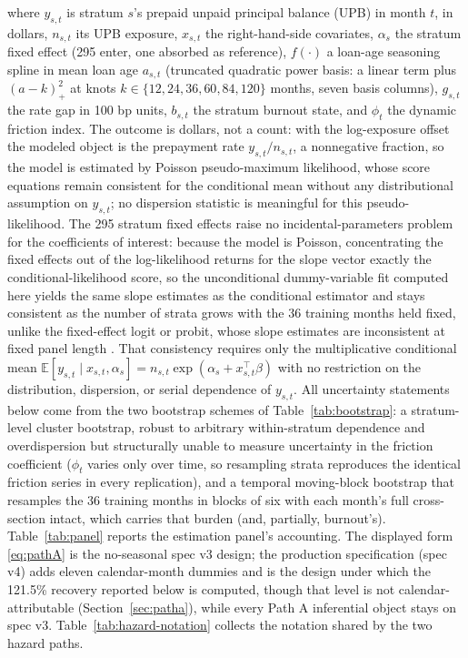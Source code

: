\documentclass[12pt]{article}
\begin{document}
where $y_{s,t}$ is stratum $s$'s prepaid unpaid principal balance (UPB) in month $t$, in dollars, $n_{s,t}$ its UPB exposure, $x_{s,t}$ the right-hand-side covariates, $\alpha_{s}$ the stratum fixed effect (295 enter, one absorbed as reference), $f(\cdot)$ a loan-age seasoning spline in mean loan age $a_{s,t}$ (truncated quadratic power basis: a linear term plus $(a - k)_+^2$ at knots $k \in \{12, 24, 36, 60, 84, 120\}$ months, seven basis columns), $g_{s,t}$ the rate gap in 100 bp units, $b_{s,t}$ the stratum burnout state, and $\phi_t$ the dynamic friction index. The outcome is dollars, not a count: with the log-exposure offset the modeled object is the prepayment rate $y_{s,t}/n_{s,t}$, a nonnegative fraction, so the model is estimated by Poisson pseudo-maximum likelihood, whose score equations remain consistent for the conditional mean without any distributional assumption on $y_{s,t}$; no dispersion statistic is meaningful for this pseudo-likelihood. The 295 stratum fixed effects raise no incidental-parameters problem for the coefficients of interest: because the model is Poisson, concentrating the fixed effects out of the log-likelihood returns for the slope vector exactly the conditional-likelihood score, so the unconditional dummy-variable fit computed here yields the same slope estimates as the conditional estimator and stays consistent as the number of strata grows with the 36 training months held fixed, unlike the fixed-effect logit or probit, whose slope estimates are inconsistent at fixed panel length \citep{wooldridge1999}. That consistency requires only the multiplicative conditional mean $\mathbb{E}[y_{s,t}\mid x_{s,t},\alpha_{s}] = n_{s,t}\exp(\alpha_{s} + x_{s,t}^{\top}\beta)$ with no restriction on the distribution, dispersion, or serial dependence of $y_{s,t}$. All uncertainty statements below come from the two bootstrap schemes of Table~\ref{tab:bootstrap}: a stratum-level cluster bootstrap, robust to arbitrary within-stratum dependence and overdispersion but structurally unable to measure uncertainty in the friction coefficient ($\phi_t$ varies only over time, so resampling strata reproduces the identical friction series in every replication), and a temporal moving-block bootstrap that resamples the 36 training months in blocks of six with each month's full cross-section intact, which carries that burden (and, partially, burnout's). Table~\ref{tab:panel} reports the estimation panel's accounting. The displayed form \eqref{eq:pathA} is the no-seasonal spec v3 design; the production specification (spec v4) adds eleven calendar-month dummies and is the design under which the 121.5\% recovery reported below is computed, though that level is not calendar-attributable (Section~\ref{sec:patha}), while every Path A inferential object stays on spec v3. Table~\ref{tab:hazard-notation} collects the notation shared by the two hazard paths.
\end{document}
